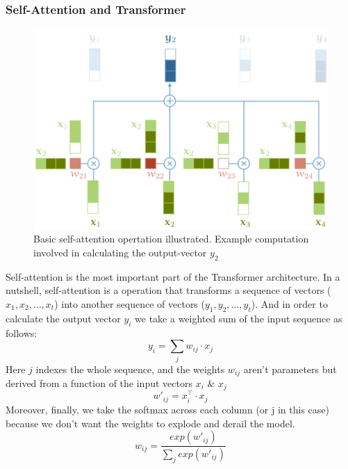 \documentclass[12pt,a4paper,twoside,openright]{report}
\begin{document}
\subsubsection{Self-Attention and Transformer}
\begin{figure}
    \centering
    \includegraphics[width=\textwidth*3/4]{figs/self-attentoin-copied.PNG}
    \caption{Basic self-attention opertation illustrated. Example computation involved in calculating the output-vector $y_2$}
    \label{fig:basic-self-attention}
\end{figure}

Self-attention is the most important part of the Transformer architecture. In a nutshell, self-attention is a operation that transforms a sequence of vectors ($x_1, x_2, ... , x_t$) into another sequence of vectors ($y_1, y_2, ... , y_t$). And in order to calculate the output vector $y_i$ we take a weighted sum of the input sequence as follows:
\[ y_i = \sum_j w_{ij} \cdot x_j \]
Here $j$ indexes the whole sequence, and the weights $w_{ij}$ aren't parameters but derived from a function of the input vectors $x_i$ \& $x_j$
\[ w'_{ij} = x_i^{\top} \cdot x_j \]
Moreover, finally, we take the softmax across each column (or j in this case) because we don't want the weights to explode and derail the model.
\[ w_{ij} = \frac{exp(w'_{ij})}{\sum_j exp(w'_{ij})} \]
\end{document}
